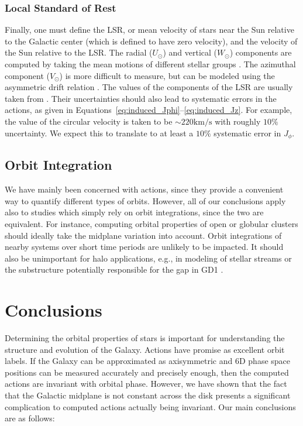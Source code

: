\documentclass[twocolumn]{aastex62}
\newcommand{\kms}{\text{km}/\text{s}}
\begin{document}
\subsubsection{Local Standard of Rest}
Finally, one must define the LSR, or mean velocity of stars near the Sun
relative to the Galactic center (which is defined to have zero velocity), and
the velocity of the Sun relative to the LSR. The radial ($U_{\odot}$) and
vertical ($W_{\odot}$) components are computed by taking the mean motions of
different stellar groups \citep[e.g.,][]{2012MNRAS.427..274S}. The azimuthal
component ($V_{\odot}$) is more difficult to measure, but can be modeled using
the asymmetric drift relation \citep{2008gady.book.....B}. The values of the
components of the LSR are usually taken from \citet{2010MNRAS.403.1829S}. Their uncertainties should also lead to systematic errors in the actions, as given in Equations~\eqref{eq:induced_Jphi}--\eqref{eq:induced_Jz}. For example, the
value of the circular velocity is taken to be $\sim 220\kms$
\citep[e.g.,][]{2012ApJ...759..131B} with roughly $10\%$ uncertainty. We expect this to translate to at least a $10\%$ systematic error in $J_{\phi}$.

\subsection{Orbit Integration}\label{ssec:orbit_integrate}
We have mainly been concerned with actions, since they provide a convenient
way to quantify different types of orbits. However, all of our conclusions
apply also to studies which simply rely on orbit integrations, since the two
are equivalent. For instance, computing orbital properties of open or globular
clusters \citep[e.g.,][]{2016A&A...588A.120C, 2018A&A...615A..49C,
2018A&A...616A..12G} should ideally take the midplane variation into account.
Orbit integrations of nearby systems over short time periods
\citep[e.g.,][]{2014MNRAS.445.2169M, 2018A&A...616A..37B} are unlikely to be impacted. It should
also be unimportant for halo applications, e.g., in modeling of
stellar streams \citep[e.g.,][]{2014ApJ...795...95B} or the substructure
potentially responsible for the gap in GD1 \citep{2018arXiv181103631B}.

\section{Conclusions}\label{sec:conclusion}
Determining the orbital properties of stars is important for understanding the structure and evolution of the Galaxy. Actions have promise as excellent orbit labels. If the Galaxy can be
approximated as axisymmetric and 6D phase space positions can be measured
accurately and precisely enough, then the computed actions are invariant with
orbital phase. However, we have shown that the fact that the Galactic midplane
is not constant across the disk presents a significant complication to
computed actions actually being invariant. Our main conclusions are as
follows:
\end{document}
